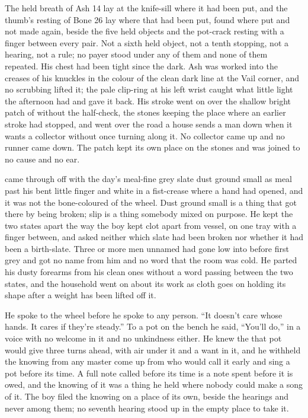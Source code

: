 The held breath of Ash 14 lay at the knife-sill where it had been put, and the thumb's resting of Bone 26 lay where that had been put, found where put and not made again, beside the five held objects and the pot-crack resting with a finger between every pair. Not a sixth held object, not a tenth stopping, not a hearing, not a rule; no payer stood under any of them and none of them repeated. His chest had been tight since the dark. Ash was worked into the creases of his knuckles in the colour of the clean dark line at the Vail corner, and no scrubbing lifted it; the pale clip-ring at his left wrist caught what little light the afternoon had and gave it back. His stroke went on over the shallow bright patch of  without the half-check, the stones keeping the place where an earlier stroke had stopped, and went over the road a house sends a man down when it wants a collector without once turning along it. No collector came up and no runner came down. The patch kept its own place on the stones and was joined to no cause and no ear.

\scenebreak

 came through  off  with the day's meal-fine grey slate dust ground small as meal past his bent little finger and white in a fist-crease where a hand had opened, and it was not the bone-coloured  of the wheel. Dust ground small is a thing that got there by being broken; slip is a thing somebody mixed on purpose. He kept the two states apart the way the boy kept clot apart from vessel, on one tray with a finger between, and asked neither which slate had been broken nor whether it had been a birth-slate. Three or more men unnamed had gone low into  before first grey and got no name from him and no word that the room was cold. He parted his dusty forearms from his clean ones without a word passing between the two states, and the household went on about its work as cloth goes on holding its shape after a weight has been lifted off it.

He spoke to the wheel before he spoke to any person. “It doesn't care whose hands. It cares if they're steady.” To a pot on the bench he said, “You'll do,” in a voice with no welcome in it and no unkindness either. He knew the  that pot would give three turns ahead, with air under it and a want in it, and he withheld the knowing from any master come up from  who would call it early and sing a pot before its time. A full note called before its time is a note spent before it is owed, and the knowing of it was a thing he held where nobody could make a song of it. The boy filed the knowing on a place of its own, beside the hearings and never among them; no seventh hearing stood up in the empty place to take it.

